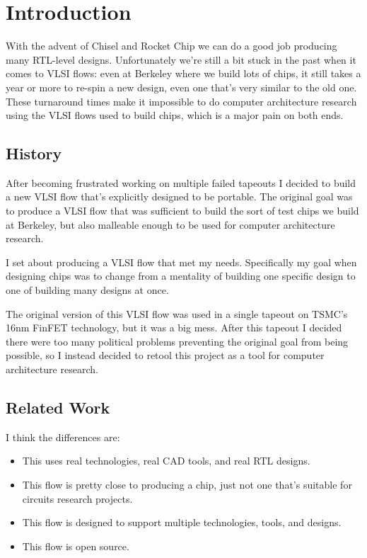 \documentclass{article}
\begin{document}
\chapter{Introduction}

With the advent of Chisel and Rocket Chip we can do a good job producing many
RTL-level designs.  Unfortunately we're still a bit stuck in the past when it
comes to VLSI flows: even at Berkeley where we build lots of chips, it still
takes a year or more to re-spin a new design, even one that's very similar to
the old one.  These turnaround times make it impossible to do computer
architecture research using the VLSI flows used to build chips, which is a
major pain on both ends. 

\section{History}

After becoming frustrated working on multiple failed tapeouts I decided to
build a new VLSI flow that's explicitly designed to be portable.  The
original goal was to produce a VLSI flow that was sufficient to build the
sort of test chips we build at Berkeley, but also malleable enough to be used
for computer architecture research.

I set about producing a VLSI flow that met my needs.  Specifically my goal
when designing chips was to change from a mentality of building one specific
design to one of building many designs at once.

The original version of this VLSI flow was used in a single tapeout on TSMC's
16nm FinFET technology, but it was a big mess.  After this tapeout I decided
there were too many political problems preventing the original goal from
being possible, so I instead decided to retool this project as a tool for
computer architecture research.

\section{Related Work}


I think the differences are:

\begin{itemize}
\item This uses real technologies, real CAD tools, and real RTL designs.
\item This flow is pretty close to producing a chip, just not one that's
suitable for circuits research projects.
\item This flow is designed to support multiple technologies, tools, and
designs.
\item This flow is open source.
\end{itemize}
\end{document}
